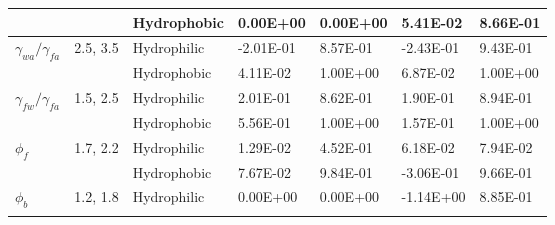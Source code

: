 \documentclass[english]{achemso}
\begin{document}
\begin{table}[H]
\begin{tabular}{|l|c|l|l|l|l|l|}
                                    &                                 & Hydrophobic                                              & 0.00E+00                                  & 0.00E+00                               & 5.41E-02                                  & 8.66E-01                               \\ \hline
\multirow{2}{*}{$\gamma_{wa}/\gamma_{fa}$}              & \multirow{2}{*}{2.5, 3.5}       & Hydrophilic                                              & -2.01E-01                                 & 8.57E-01                               & -2.43E-01                                 & 9.43E-01                               \\ \cline{3-7} 
                                    &                                 & Hydrophobic                                              & 4.11E-02                                  & 1.00E+00                               & 6.87E-02                                  & 1.00E+00                               \\ \hline
\multirow{2}{*}{$\gamma_{fw}/\gamma_{fa}$}              & \multirow{2}{*}{1.5, 2.5}       & Hydrophilic                                              & 2.01E-01                                  & 8.62E-01                               & 1.90E-01                                  & 8.94E-01                               \\ \cline{3-7} 
                                    &                                 & Hydrophobic                                              & 5.56E-01                                  & 1.00E+00                               & 1.57E-01                                  & 1.00E+00                               \\ \hline
\multirow{2}{*}{$\phi_{f}$}             & \multirow{2}{*}{1.7, 2.2}       & Hydrophilic                                              & 1.29E-02                                  & 4.52E-01                               & 6.18E-02                                  & 7.94E-02                               \\ \cline{3-7} 
                                    &                                 & Hydrophobic                                              & 7.67E-02                                  & 9.84E-01                               & -3.06E-01                                 & 9.66E-01                               \\ \hline
\multirow{2}{*}{$\phi_{b}$}             & \multirow{2}{*}{1.2, 1.8}       & Hydrophilic                                              & 0.00E+00                                  & 0.00E+00                               & -1.14E+00                                 & 8.85E-01                               \\ \cline{3-7} 

\end{tabular}
\end{table}
\end{document}
